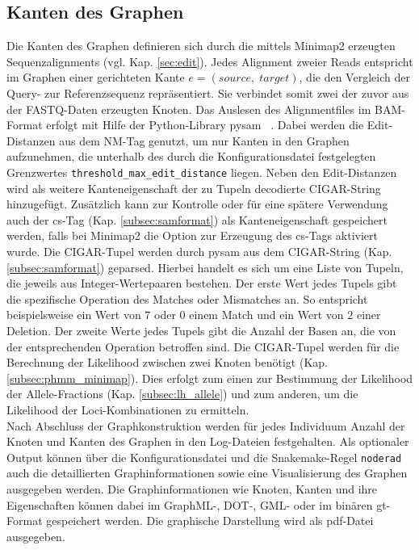 \subsection{Kanten des Graphen} \label{subsec:edges}
Die Kanten des Graphen definieren sich durch die mittels Minimap2 erzeugten Sequenzalignments (vgl. Kap. \ref{sec:edit}). Jedes Alignment zweier Reads entspricht im Graphen einer gerichteten Kante $e = (source,\; target)$, die den Vergleich der Query- zur Referenzsequenz repräsentiert. Sie verbindet somit zwei der zuvor aus der FASTQ-Daten erzeugten Knoten. Das Auslesen des Alignmentfiles im BAM-Format erfolgt mit Hilfe der Python-Library pysam ~\cite{pysam}. Dabei werden die Edit-Distanzen aus dem NM-Tag genutzt, um nur Kanten in den Graphen aufzunehmen, die unterhalb des durch die Konfigurationsdatei festgelegten Grenzwertes \lstinline|threshold_max_edit_distance| liegen. Neben den Edit-Distanzen wird als weitere Kanteneigenschaft der zu Tupeln decodierte CIGAR-String hinzugefügt. Zusätzlich kann zur Kontrolle oder für eine spätere Verwendung auch der cs-Tag (Kap. \ref{subsec:samformat}) als Kanteneigenschaft gespeichert werden, falls bei Minimap2 die Option zur Erzeugung des cs-Tags aktiviert wurde. Die CIGAR-Tupel werden durch pysam aus dem CIGAR-String (Kap. \ref{subsec:samformat}) geparsed. Hierbei handelt es sich um eine Liste von Tupeln, die jeweils aus Integer-Wertepaaren bestehen. Der erste Wert jedes Tupels gibt die spezifische Operation des Matches oder Mismatches an. So entspricht beispielsweise ein Wert von $ 7 $ oder $ 0 $ einem Match und ein Wert von $ 2 $ einer Deletion. Der zweite Werte jedes Tupels gibt die Anzahl der Basen an, die von der entsprechenden Operation betroffen sind. Die CIGAR-Tupel werden für die Berechnung der Likelihood zwischen zwei Knoten benötigt (Kap. \ref{subsec:phmm_minimap}). Dies erfolgt zum einen zur Bestimmung der Likelihood der Allele-Fractions (Kap. \ref{subsec:lh_allele}) und zum anderen, um die Likelihood der Loci-Kombinationen zu ermitteln. \\

Nach Abschluss der Graphkonstruktion werden für jedes Individuum Anzahl der Knoten und Kanten des Graphen in den Log-Dateien festgehalten. Als optionaler Output können über die Konfigurationsdatei und die Snakemake-Regel \lstinline|noderad| auch die detaillierten Graphinformationen sowie eine Visualisierung des Graphen ausgegeben werden. Die Graphinformationen wie Knoten, Kanten und ihre Eigenschaften können dabei im GraphML-, DOT-, GML- oder im binären gt-Format gespeichert werden. Die graphische Darstellung wird als pdf-Datei ausgegeben. \\

